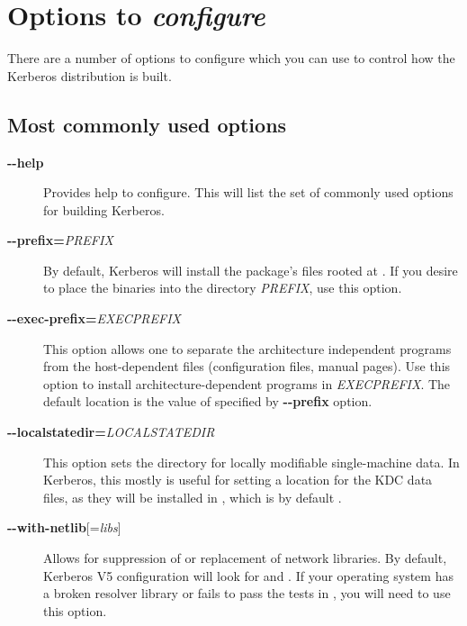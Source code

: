 \documentclass[letterpaper,10pt,english]{sphinxmanual}
\begin{document}
\section{Options to \emph{configure}}
\label{build/options2configure:options2configure}\label{build/options2configure::doc}\label{build/options2configure:options-to-configure}
There are a number of options to configure which you can use to
control how the Kerberos distribution is built.


\subsection{Most commonly used options}
\label{build/options2configure:most-commonly-used-options}\begin{description}
\item[{\textbf{-}\textbf{-help}}] \leavevmode
Provides help to configure.  This will list the set of commonly
used options for building Kerberos.

\item[{\textbf{-}\textbf{-prefix=}\emph{PREFIX}}] \leavevmode
By default, Kerberos will install the package's files rooted at
.  If you desire to place the binaries into the
directory \emph{PREFIX}, use this option.

\item[{\textbf{-}\textbf{-exec-prefix=}\emph{EXECPREFIX}}] \leavevmode
This option allows one to separate the architecture independent
programs from the host-dependent files (configuration files,
manual pages).  Use this option to install architecture-dependent
programs in \emph{EXECPREFIX}.  The default location is the value of
specified by \textbf{-}\textbf{-prefix} option.

\item[{\textbf{-}\textbf{-localstatedir=}\emph{LOCALSTATEDIR}}] \leavevmode
This option sets the directory for locally modifiable
single-machine data.  In Kerberos, this mostly is useful for
setting a location for the KDC data files, as they will be
installed in , which is by default
.

\item[{\textbf{-}\textbf{-with-netlib}{[}=\emph{libs}{]}}] \leavevmode
Allows for suppression of or replacement of network libraries.  By
default, Kerberos V5 configuration will look for  and
.  If your operating system has a broken resolver
library or fails to pass the tests in , you
will need to use this option.


\end{description}
\end{document}
